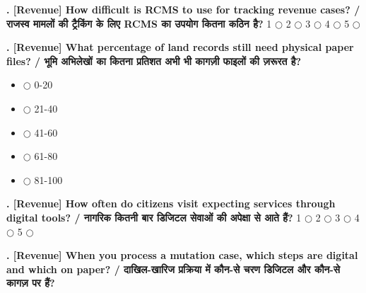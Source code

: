 \documentclass[11pt,a4paper]{article}
\newcounter{qcounter}
\begin{document}
\textbf{. [Revenue] How difficult is RCMS to use for tracking revenue cases? / राजस्व मामलों की ट्रैकिंग के लिए RCMS का उपयोग कितना कठिन है?}
\vspace{0.1cm}
\vspace{0.1cm}
1 $\bigcirc$ \hspace{1cm} 2 $\bigcirc$ \hspace{1cm} 3 $\bigcirc$ \hspace{1cm} 4 $\bigcirc$ \hspace{1cm} 5 $\bigcirc$
\vspace{0.4cm}

\textbf{. [Revenue] What percentage of land records still need physical paper files? / भूमि अभिलेखों का कितना प्रतिशत अभी भी कागज़ी फाइलों की ज़रूरत है?}
\vspace{0.1cm}
\begin{itemize}[label=, itemsep=0.1cm, leftmargin=0.5cm]
    \item $\bigcirc$ 0-20%
    \item $\bigcirc$ 21-40%
    \item $\bigcirc$ 41-60%
    \item $\bigcirc$ 61-80%
    \item $\bigcirc$ 81-100%
\end{itemize}
\vspace{0.2cm}

\textbf{. [Revenue] How often do citizens visit expecting services through digital tools? / नागरिक कितनी बार डिजिटल सेवाओं की अपेक्षा से आते हैं?}
\vspace{0.1cm}
\vspace{0.1cm}
1 $\bigcirc$ \hspace{1cm} 2 $\bigcirc$ \hspace{1cm} 3 $\bigcirc$ \hspace{1cm} 4 $\bigcirc$ \hspace{1cm} 5 $\bigcirc$
\vspace{0.4cm}

\textbf{. [Revenue] When you process a mutation case, which steps are digital and which on paper? / दाखिल-खारिज प्रक्रिया में कौन-से चरण डिजिटल और कौन-से कागज़ पर हैं?}
\vspace{0.1cm}
\vspace{0.2cm}
\hrulefill\par\vspace{0.6cm}\hrulefill\par\vspace{0.6cm}\hrulefill
\vspace{0.4cm}
\end{document}
